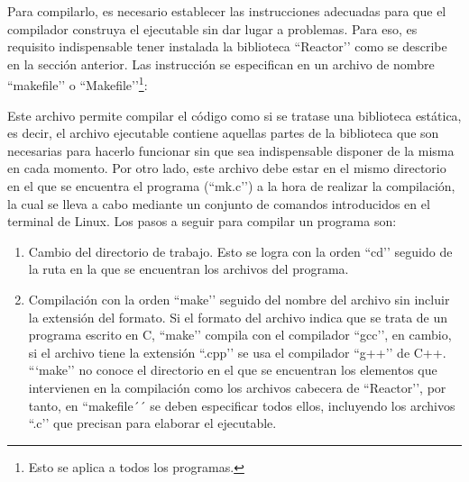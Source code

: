 Para compilarlo, es necesario establecer las instrucciones adecuadas para que el compilador construya el ejecutable sin dar lugar a problemas. Para eso, es requisito indispensable tener instalada la biblioteca ``Reactor’’ como se describe en la sección anterior. Las instrucción se especifican en un archivo de nombre ``makefile’’ o ``Makefile’’\footnote{Esto se aplica a todos los programas.}:


Este archivo permite compilar el código como si se tratase una biblioteca estática, es decir, el archivo ejecutable contiene aquellas partes de la biblioteca que son necesarias para hacerlo funcionar sin que sea indispensable disponer de la misma en cada momento. 
Por otro lado, este archivo debe estar en el mismo directorio en el que se encuentra el programa (``mk.c’’) a la hora de realizar la compilación, la cual se lleva a cabo mediante un conjunto de comandos introducidos en el terminal de Linux. Los pasos a seguir para compilar un programa son:

\begin{enumerate}
    \item Cambio del directorio de trabajo. Esto se logra con la orden ``cd’’ seguido de la ruta en la que se encuentran los archivos del programa.
    \item Compilación con la orden ``make’’ seguido del nombre del archivo sin incluir la extensión del formato. Si el formato del archivo indica que se trata de un programa escrito en C, ``make’’ compila con el compilador ``gcc’’, en cambio, si el archivo tiene la extensión ``.cpp’’ se usa el compilador ``g++’’ de C++.
    ```make’’ no conoce el directorio en el que se encuentran los elementos que intervienen en la compilación como los archivos cabecera de ``Reactor’’, por tanto, en ``makefile´´ se deben especificar todos ellos, incluyendo los archivos ``.c’’ que precisan para elaborar el ejecutable.
\end{enumerate}

